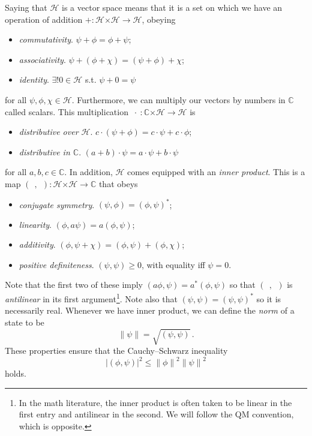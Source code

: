 \documentclass{article}
\theoremstyle{plain}\theoremheaderfont{\normalfont\itshape}\theorembodyfont{\rmfamily}\theoremseparator{.}\newtheorem*{rem}{Remark}\newtheorem*{ex}{Example}\newtheorem*{proof}{Proof}\newtheorem*{altp}{Alternative proof}
\theoremstyle{plain}\theoremheaderfont{\normalfont\bfseries}\theorembodyfont{\rmfamily}\theoremseparator{.}\newtheorem{thm}{Theorem}[section]\newtheorem{lem}[thm]{Lemma}\newtheorem{prop}[thm]{Proposition}\newtheorem*{cor}{Corollary}\newtheorem{defn}[thm]{Definition}\newtheorem{clm}[thm]{Claim}\newtheorem{clminproof}{Claim}
\theoremstyle{break}\theoremheaderfont{\normalfont\itshape}\theorembodyfont{\rmfamily}\theoremseparator{.\medskip}\newtheorem*{proofskip}{Proof}\newtheorem*{exs}{Examples}\newtheorem*{rems}{Remarks}
\theoremstyle{break}\theoremheaderfont{\normalfont\bfseries}\theorembodyfont{\rmfamily}\theoremseparator{.\medskip}\newtheorem{lemskip}[thm]{Lemma}\newtheorem{defnskip}[thm]{Definition}\newtheorem{propskip}[thm]{Proposition}\newtheorem{thmskip}[thm]{Theorem}
\numberwithin{equation}{section}
\newcommand{\vb}[1]{\bm{\mathrm{#1}}}
\newcommand{\cross}{\bm{\times}}
\newcommand{\abs}[1]{\left| #1 \right|}
\newcommand{\norm}[1]{\left\| #1 \right\|}
\newcommand{\hb}{\mathcal{H}}
\newcommand{\CC}{\mathbb{C}}
\begin{document}
    Saying that \(\hb\) is a vector space means that it is a set on which we have an operation of addition \(+:\hb\cross\hb\to\hb\), obeying
    \begin{itemize}[topsep=0pt]
        \item \textit{commutativity}. \(\psi+\phi=\phi+\psi\);
        \item \textit{associativity}. \(\psi+(\phi+\chi)=(\psi+\phi)+\chi\);
        \item \textit{identity}. \(\exists! \vb{0}\in\hb\) s.t. \(\psi+\vb{0}=\psi\)
    \end{itemize}
    for all \(\psi,\phi,\chi\in\hb\). Furthermore, we can multiply our vectors by numbers in \(\CC\) called scalars. This multiplication \(\ \cdot\ :\CC\cross\hb\to\hb\) is
    \begin{itemize}[topsep=0pt]
        \item \textit{distributive over \(\hb\)}. \(c\cdot(\psi+\phi)=c\cdot\psi+c\cdot\phi\);
        \item \textit{distributive in \(\CC\)}. \((a+b)\cdot\psi=a\cdot\psi+b\cdot\psi\)
    \end{itemize}
    for all \(a,b,c\in\CC\). In addition, \(\hb\) comes equipped with an \textit{inner product}. This is a map \((\ \ ,\ \ ):\hb\cross\hb\to\CC\) that obeys
    \begin{itemize}[topsep=0pt]
        \item \textit{conjugate symmetry}. \((\psi,\phi)=(\phi,\psi)^*\);
        \item \textit{linearity}. \((\phi,a\psi)=a(\phi,\psi)\);
        \item \textit{additivity}. \((\phi,\psi+\chi)=(\phi,\psi)+(\phi,\chi)\);
        \item \textit{positive definiteness}. \((\psi,\psi)\ge 0\), with equality iff \(\psi=\vb{0}\).
    \end{itemize}
    Note that the first two of these imply \((a\phi,\psi)=a^*(\phi,\psi)\) so that \((\ \ ,\ \ )\) is \textit{antilinear} in its first argument\footnote{In the math literature, the inner product is often taken to be linear in the first entry and antilinear in the second. We will follow the QM convention, which is opposite.}. Note also that \((\psi,\psi)=(\psi,\psi)^*\) so it is necessarily real. Whenever we have inner product, we can define the \textit{norm} of a state to be
    \begin{equation}
        \norm{\psi}=\sqrt{(\psi,\psi)}\,.
    \end{equation}
    These properties ensure that the Cauchy--Schwarz inequality
    \begin{equation}
        \abs{(\phi,\psi)}^2\le\norm{\phi}^2\norm{\psi}^2
    \end{equation}
    holds.
\end{document}
